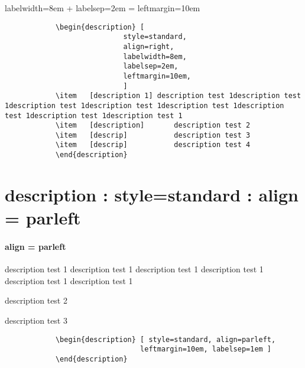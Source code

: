 \documentclass[12pt, a4paper, oneside]{book}
\let\stdsection\section
\renewcommand\section{\newpage\stdsection}
\begin{document}
			labelwidth=8em + labelsep=2em = leftmargin=10em

		\begin{mdframed}[style=code_document, frametitle={code}]
			\begin{verbatim}
			\begin{description}	[
							style=standard, 
							align=right,
							labelwidth=8em,
							labelsep=2em,
							leftmargin=10em,
							]
			\item	[description 1]	description test 1description test 1description test 1description test 1description test 1description test 1description test 1description test 1
			\item	[description]		description test 2
			\item	[descrip]			description test 3
			\item	[descrip]			description test 4
			\end{description}
			\end{verbatim}
		\end{mdframed}


	\section{description : style=standard : align = parleft}

			\paragraph{ align = parleft }
			\begin{description}	[
							style=standard, 
							align=parleft,
							leftmargin=10em,
							labelsep=1em
							]
			\item	[description1]		description test 1 description test 1 description test 1 description test 1 description test 1 description test 1
			\item	[description]		description test 2
			\item	[descrip]			description test 3
			\end{description}


		\begin{mdframed}[style=code_document, frametitle={code}]
			\begin{verbatim}
			\begin{description}	[ style=standard, align=parleft, 
								leftmargin=10em, labelsep=1em ]
			\end{description}
			\end{verbatim}
		\end{mdframed}
\end{document}
